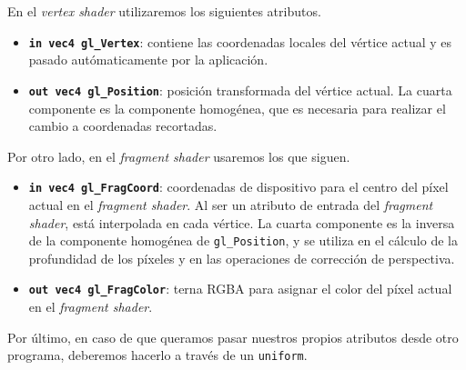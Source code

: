 En el \textit{vertex shader} utilizaremos los siguientes atributos.
\begin{itemize}    
    \item \textbf{\texttt{in vec4 gl\_Vertex}}: contiene las coordenadas locales del vértice actual y es pasado autómaticamente por la aplicación.
    \item \textbf{\texttt{out vec4 gl\_Position}}: posición transformada del vértice actual. La cuarta componente es la componente homogénea, que es necesaria para realizar el cambio a coordenadas recortadas.
\end{itemize}
Por otro lado, en el \textit{fragment shader} usaremos los que siguen.
\begin{itemize}
    \item \textbf{\texttt{in vec4 gl\_FragCoord}}: coordenadas de dispositivo para el centro del píxel actual en el \textit{fragment shader}. Al ser un atributo de entrada del \textit{fragment shader}, está interpolada en cada vértice. La cuarta componente es la inversa de la componente homogénea de \texttt{gl\_Position}, y se utiliza en el cálculo de la profundidad de los píxeles y en las operaciones de corrección de perspectiva.
    \item \textbf{\texttt{out vec4 gl\_FragColor}}: terna RGBA para asignar el color del píxel actual en el \textit{fragment shader}.
\end{itemize}
Por último, en caso de que queramos pasar nuestros propios atributos desde otro programa, deberemos hacerlo a través de un \texttt{uniform}.\newline

